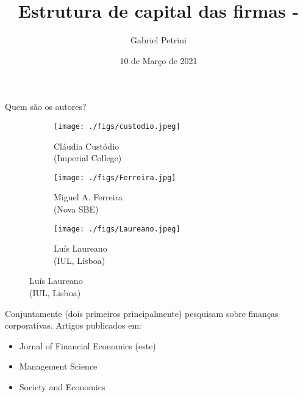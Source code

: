 \documentclass[presentation]{beamer}
\author{Gabriel Petrini}
\date{10 de Março de 2021}
\title{Estrutura de capital das firmas - \fullcite{custodio_2013_Why}}
\begin{document}
\maketitle
\section{}
\label{sec:orgf353795}

\begin{frame}[label={sec:org982374f}]{Quem são os autores?}
\begin{figure}
\caption{Autores}
\begin{subfigure}{.3\linewidth}
\centering
\texttt{[image: ./figs/custodio.jpeg]}
\caption{Cláudia Custódio\\(Imperial College)}
\end{subfigure}%
\begin{subfigure}{.3\linewidth}
\centering
\texttt{[image: ./figs/Ferreira.jpg]}
\caption{Miguel A. Ferreira\\(Nova SBE)}
\end{subfigure}%
\begin{subfigure}{.3\linewidth}
\centering
\texttt{[image: ./figs/Laureano.jpeg]}
\caption{Luís Laureano\\(IUL, Lisboa)}
\end{subfigure}
\end{figure}


Conjuntamente (dois primeiros principalmente) pesquisam sobre finanças corporativas.
Artigos publicados em:
\begin{itemize}
\item Jornal of Financial Economics (este)
\item Management Science
\item Society and Economics
\end{itemize}
\end{frame}
\end{document}
